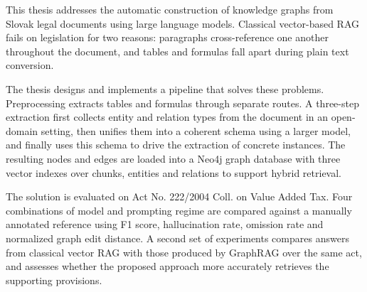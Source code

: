 This thesis addresses the automatic construction of knowledge graphs from Slovak legal documents using large language models. Classical vector-based RAG fails on legislation for two reasons: paragraphs cross-reference one another throughout the document, and tables and formulas fall apart during plain text conversion.

The thesis designs and implements a pipeline that solves these problems. Preprocessing extracts tables and formulas through separate routes. A three-step extraction first collects entity and relation types from the document in an open-domain setting, then unifies them into a coherent schema using a larger model, and finally uses this schema to drive the extraction of concrete instances. The resulting nodes and edges are loaded into a Neo4j graph database with three vector indexes over chunks, entities and relations to support hybrid retrieval.

The solution is evaluated on Act No. 222/2004 Coll. on Value Added Tax. Four combinations of model and prompting regime are compared against a manually annotated reference using F1 score, hallucination rate, omission rate and normalized graph edit distance. A second set of experiments compares answers from classical vector RAG with those produced by GraphRAG over the same act, and assesses whether the proposed approach more accurately retrieves the supporting provisions.